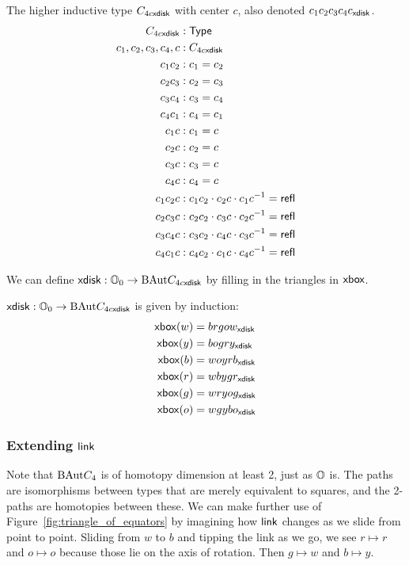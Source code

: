 \begin{mydef}
The higher inductive type \( C_{4c\mathsf{xdisk}} \) with center \( c \), also denoted \( c_1c_2c_3c_4c_{\mathsf{xdisk}} \).
\begin{align*}
C_{4c\mathsf{xdisk}} &: \mathsf{Type} \\
c_1, c_2, c_3, c_4, c &: C_{4c\mathsf{xdisk}} \\
c_1c_2 &: c_1 = c_2 \\
c_2c_3 &: c_2 = c_3 \\
c_3c_4 &: c_3 = c_4 \\
c_4c_1 &: c_4 = c_1 \\
c_1c &: c_1 = c \\
c_2c &: c_2 = c \\
c_3c &: c_3 = c \\
c_4c &: c_4 = c \\
c_1c_2c &: c_1c_2\cdot c_2c\cdot c_1c^{-1} = \mathsf{refl} \\
c_2c_3c &: c_2c_2\cdot c_3c\cdot c_2c^{-1} = \mathsf{refl} \\
c_3c_4c &: c_3c_2\cdot c_4c\cdot c_3c^{-1} = \mathsf{refl} \\
c_4c_1c &: c_4c_2\cdot c_1c\cdot c_4c^{-1} = \mathsf{refl}
\end{align*}
\end{mydef}

We can define \( \mathsf{xdisk}:\mathbb{O}_0\to\mathrm{BAut} C_{4c\mathsf{xdisk}} \) by filling in the triangles in \( \mathsf{xbox} \).

\begin{mydef}
\( \mathsf{xdisk}:\mathbb{O}_0\to\mathrm{BAut} C_{4c\mathsf{xdisk}} \) is given by induction:
\begin{align*}
\mathsf{xbox}(w) &= brgow_{\mathsf{xdisk}} \\
\mathsf{xbox}(y) &= bogry_{\mathsf{xdisk}} \\
\mathsf{xbox}(b) &= woyrb_{\mathsf{xdisk}} \\
\mathsf{xbox}(r) &= wbygr_{\mathsf{xdisk}} \\
\mathsf{xbox}(g) &= wryog_{\mathsf{xdisk}} \\
\mathsf{xbox}(o) &= wgybo_{\mathsf{xdisk}}
\end{align*}
\end{mydef}

\subsubsection{Extending \texorpdfstring{\( \mathsf{link} \)}{link}}

Note that \( \mathrm{BAut} C_4 \) is of homotopy dimension at least 2, just as \( \mathbb{O} \) is. The paths are isomorphisms between types that are merely equivalent to squares, and the 2-paths are homotopies between these. We can make further use of Figure~\ref{fig:triangle_of_equators} by imagining how \( \mathsf{link} \) changes as we slide from point to point. Sliding from \( w \) to \( b \) and tipping the link as we go, we see \( r\mapsto r \) and \( o\mapsto o \) because those lie on the axis of rotation. Then \( g\mapsto w \) and \( b\mapsto y \). 

